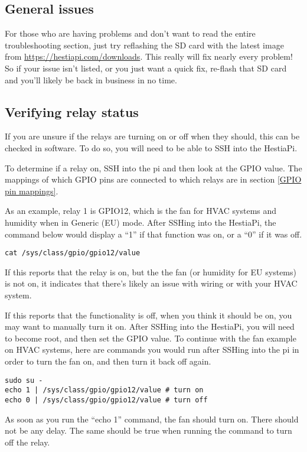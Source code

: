 \subsection{General issues}
For those who are having problems and don't want to read the entire
troubleshooting section, just try reflashing the SD card with the latest image
from \url{https://hestiapi.com/downloads}. This really will fix nearly every
problem! So if your issue isn't listed, or you just want a quick fix, re-flash
that SD card and you'll likely be back in business in no time.

\subsection{Verifying relay status}
If you are unsure if the relays are turning on or off when they should, this
can be checked in software. To do so, you will need to be able to SSH into the
HestiaPi.

To determine if a relay on, SSH into the pi and then look at the GPIO value.
The mappings of which GPIO pins are connected to which relays are in section
\ref{GPIO pin mappings}.

As an example, relay 1 is GPIO12, which is the fan for HVAC systems and
humidity when in Generic (EU) mode. After SSHing into the HestiaPi, the command
below would display a ``1'' if that function was on, or a ``0'' if it was off.

\texttt{cat /sys/class/gpio/gpio12/value}

If this reports that the relay is on, but the the fan (or humidity for EU
systems) is not on, it indicates that there's likely an issue with wiring or
with your HVAC system.

If this reports that the functionality is off, when you think it should be on,
you may want to manually turn it on. After SSHing into the HestiaPi, you will
need to become root, and then set the GPIO value. To continue with the fan
example on HVAC systems, here are commands you would run after SSHing into the
pi in order to turn the fan on, and then turn it back off again.

\texttt{sudo su -\\
echo 1 | /sys/class/gpio/gpio12/value \# turn on\\
echo 0 | /sys/class/gpio/gpio12/value \# turn off\\
}

As soon as you run the ``echo 1'' command, the fan should turn on. There should
not be any delay. The same should be true when running the command to turn off
the relay.


